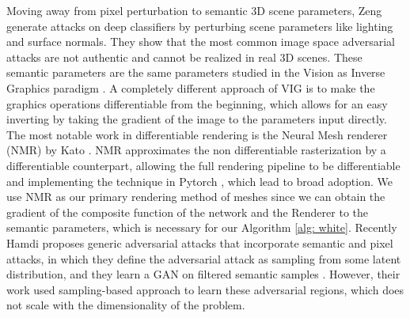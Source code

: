 Moving away from pixel perturbation to semantic 3D scene parameters, Zeng \etal \cite{normal-light-attack} generate attacks on deep classifiers by perturbing scene parameters like lighting and surface normals. They show that the most common image space adversarial attacks are not authentic and cannot be realized in real 3D scenes. These semantic parameters are the same parameters studied in the Vision as Inverse Graphics paradigm \cite{old-vision1,old-vision2}. A completely different approach of VIG is to make the graphics operations differentiable from the beginning, which allows for an easy inverting by taking the gradient of the image to the parameters input directly. The most notable work in differentiable rendering is the Neural Mesh renderer (NMR) by Kato \etal \cite{vig-nmr}. NMR approximates the non differentiable rasterization by a differentiable counterpart, allowing the full rendering pipeline to be differentiable and  implementing the technique in Pytorch \cite{paszke2017pytorch}, which lead to broad adoption. We use NMR as our primary rendering method of meshes since we can obtain the gradient of the composite function of the network and the Renderer to the semantic parameters, which is necessary for our Algorithm \ref{alg: white}. Recently Hamdi \etal proposes generic adversarial attacks that incorporate semantic and pixel attacks, in which they define the adversarial attack as sampling from some latent distribution, and they learn a GAN on filtered semantic samples \cite{sada}. However, their work used sampling-based approach to learn these adversarial regions, which does not scale with the dimensionality of the problem.
